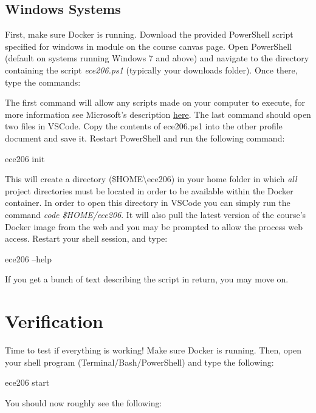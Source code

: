 \documentclass[11pt, letterpaper, titlepage, oneside]{memoir}
\begin{document}
        \subsection*{Windows Systems}
            First, make sure Docker is running. Download the provided PowerShell script specified for windows in module on the course canvas page. Open PowerShell (default on systems running Windows 7 and above) and navigate to the directory containing the script \textit{ece206.ps1} (typically your downloads folder). Once there, type the commands:
            The first command will allow any scripts made on your computer to execute, for more information see Microsoft's description \href{https://docs.microsoft.com/en-us/powershell/module/microsoft.powershell.security/set-executionpolicy?view=powershell-7.1}{here}. The last command should open two files in VSCode. Copy the contents of ece206.ps1 into the other profile document and save it. Restart PowerShell and run the following command:
            \begin{bash}
                ece206 init
            \end{bash}
            This will create a directory (\$HOME\textbackslash ece206) in your home folder in which \textit{all} project directories must be located in order to be available within the Docker container. In order to open this directory in VSCode you can simply run the command \textit{code \$HOME/ece206}. It will also pull the latest version of the course's Docker image from the web and you may be prompted to allow the process web access. Restart your shell session, and type:
            \begin{bash}
                ece206 --help
            \end{bash}
            If you get a bunch of text describing the script in return, you may move on.

    \section*{Verification}
        Time to test if everything is working! Make sure Docker is running. Then, open your shell program (Terminal/Bash/PowerShell) and type the following:
        \begin{bash}
            ece206 start
        \end{bash}
        You should now roughly see the following:
\end{document}
